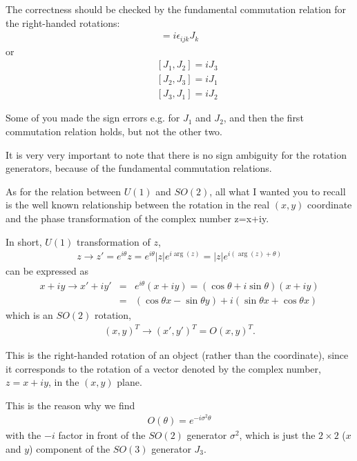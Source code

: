 \documentclass[12pt]{article}
\begin{document}
  The correctness should be checked by the fundamental
  commutation relation for the right-handed rotations:
\begin{eqnarray}
  [ J_i, J_j ] = i \epsilon_{ijk} J_k
\end{eqnarray}
   or
\begin{eqnarray}
  &&[{J_1},{J_2}]= i {J_3}\\
  &&[{J_2},{J_3}]= i {J_1}\\
  &&[{J_3},{J_1}]= i {J_2}
\end{eqnarray}
 
  Some of you made the sign errors e.g. for $J_1$ and $J_2$,
  and then the first commutation relation holds, but not
  the other two.

  It is very very important to note that there is no
  sign ambiguity for the rotation generators, because
  of the fundamental commutation relations.

  As for the relation between $U(1)$ and $SO(2)$, all what
  I wanted you to recall is the well known relationship
  between the rotation in the real $(x,y)$ coordinate and
  the phase transformation of the complex number z=x+iy.

  In short, $U(1)$ transformation of $z$,
\begin{eqnarray}
  z \to z' = e^{i\theta} z
  = e^{i \theta} |z| e^{i\arg(z)}
  = |z| e^{i(\arg(z)+\theta)}
\end{eqnarray}
  can be expressed as
\begin{eqnarray}
  x+iy \to  x'+iy' &=& e^{i\theta} (x+iy)
              = (\cos\theta+i\sin\theta)(x+iy) \\
              &=& (\cos\theta x -\sin\theta y)
              +i(\sin\theta x +\cos\theta x)
\end{eqnarray}
  which is an $SO(2)$ rotation,
\begin{eqnarray}
  (x,y)^T \to (x',y')^T = O (x,y)^T.
\end{eqnarray}

  This is the right-handed rotation of an object
  (rather than the coordinate), since it corresponds
  to the rotation of a vector denoted by the complex
  number, $z = x+iy$, in the $(x,y)$ plane.

  This is the reason why we find
\begin{eqnarray}
  O(\theta) = e^{ -i \sigma^2 \theta}
\end{eqnarray}
   with the $-i$ factor in front of the $SO(2)$ generator $\sigma^2$,
  which is just the $2 \times 2$ ($x$ and $y$) component of the $SO(3)$
  generator $J_3$.
\end{document}
